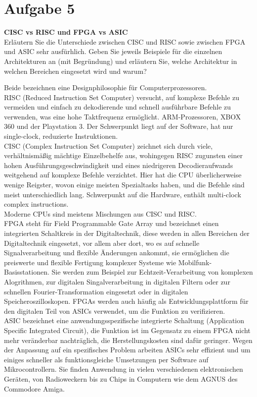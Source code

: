 \documentclass[12pt,a4paper,ngerman]{article}
\begin{document}
\section{Aufgabe 5}
\begin{framed}
\textbf{CISC vs RISC und FPGA vs ASIC}\\
Erläutern Sie die Unterschiede zwischen CISC und RISC sowie zwischen FPGA und ASIC sehr ausfürhlich. Geben Sie jeweils Beispiele für die einzelnen Architekturen an (mit Begründung) und erläutern Sie, welche Architektur in welchen Bereichen eingesetzt wird und warum?
\end{framed}
Beide bezeichnen eine Designphilosophie für Computerprozessoren.\\
RISC (Reduced Instruction Set Computer) versucht, auf komplexe Befehle zu vermeiden und einfach zu dekodierende und schnell ausführbare Befehle zu verwenden, was eine hohe Taktfrequenz ermöglicht. ARM-Prozessoren, XBOX 360 und der Playstation 3. Der Schwerpunkt liegt auf der Software, hat nur single-clock, reduzierte Instruktionen.\\
CISC (Complex Instruction Set Computer) zeichnet sich durch viele, verhältnismäßig mächtige Einzelbehelfe aus, wohingegen RISC zugunsten einer hohen Ausführungsgeschwindigkeit und eines niedrigeren Decodieraufwands weitgehend auf komplexe Befehle verzichtet. Hier hat die CPU überlicherweise wenige Reigster, wovon einige meisten Spezialtasks haben, und die Befehle sind meist unterschiedlich lang. Schwerpunkt auf die Hardware, enthält multi-clock complex instructions. \\
Moderne CPUs sind meistens Mischungen aus CISC und RISC.\\
FPGA steht für Field Programmable Gate Array und bezeichnet einen integrierten Schaltkreis in der Digitaltechnik, diese werden in allen Bereichen der Digitaltechnik eingesetzt, vor allem aber dort, wo es auf schnelle Signalverarbeitung und flexible Änderungen ankommt, sie ermöglichen die preiswerte und flexible Fertigung komplexer Systeme wie Mobilfunk-Basisstationen. Sie werden zum Beispiel zur Echtzeit-Verarbeitung von komplexen Alogrithmen, zur digitalen Singalverarbeitung in digitalen Filtern oder zur schnellen Fourier-Transformation eingesetzt oder in digitalen Speicheroszilloskopen. FPGAs werden auch häufig als Entwicklungsplattform für den digitalen Teil von ASICs verwendet, um die Funktion zu verifizieren.  \\
ASIC bezeichnet eine anwendungsspezifische integrierte Schaltung (Application Specific Integrated Circuit), die Funktion ist im Gegensatz zu einem FPGA nicht mehr veränderbar nachträglich, die Herstellungskosten sind dafür geringer. Wegen der Anpassung auf ein spezifisches Problem arbeiten ASICs sehr effizient und um einiges schneller als funktionsgleiche Umsetzungen per Software auf Mikrocontrollern. Sie finden Anwendung in vielen verschiedenen elektronischen Geräten, von Radioweckern bis zu Chips in Computern wie dem AGNUS des Commodore Amiga. 
\pagebreak
\end{document}
